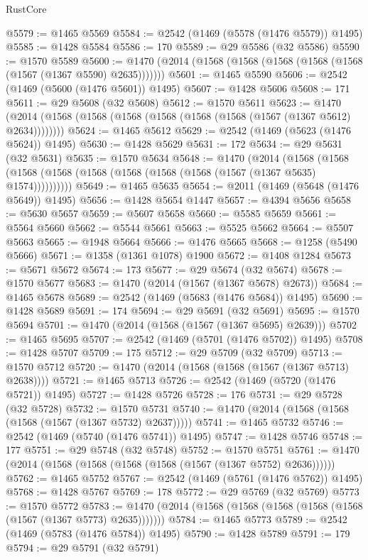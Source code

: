 \begin{lexlean}{RustCore}
\begin{coremodule}
@5579 := @1465 @5569
@5584 := @2542 (@1469 (@5578 (@1476 @5579)) @1495)
@5585 := @1428 @5584
@5586 := 170
@5589 := @29 @5586 (@32 @5586)
@5590 := @1570 @5589
@5600 := @1470 (@2014 (@1568 (@1568 (@1568 (@1568 (@1568 (@1567 (@1367 @5590) @2635)))))))
@5601 := @1465 @5590
@5606 := @2542 (@1469 (@5600 (@1476 @5601)) @1495)
@5607 := @1428 @5606
@5608 := 171
@5611 := @29 @5608 (@32 @5608)
@5612 := @1570 @5611
@5623 := @1470 (@2014 (@1568 (@1568 (@1568 (@1568 (@1568 (@1568 (@1567 (@1367 @5612) @2634))))))))
@5624 := @1465 @5612
@5629 := @2542 (@1469 (@5623 (@1476 @5624)) @1495)
@5630 := @1428 @5629
@5631 := 172
@5634 := @29 @5631 (@32 @5631)
@5635 := @1570 @5634
@5648 := @1470
    (@2014
      (@1568 (@1568 (@1568 (@1568 (@1568 (@1568 (@1568 (@1568 (@1567 (@1367 @5635) @1574))))))))))
@5649 := @1465 @5635
@5654 := @2011 (@1469 (@5648 (@1476 @5649)) @1495)
@5656 := @1428 @5654 @1447
@5657 := @4394 @5656
@5658 := @5630 @5657
@5659 := @5607 @5658
@5660 := @5585 @5659
@5661 := @5564 @5660
@5662 := @5544 @5661
@5663 := @5525 @5662
@5664 := @5507 @5663
@5665 := @1948 @5664
@5666 := @1476 @5665
@5668 := @1258 (@5490 @5666)
@5671 := @1358 (@1361 @1078) @1900
@5672 := @1408 @1284
@5673 := @5671 @5672
@5674 := 173
@5677 := @29 @5674 (@32 @5674)
@5678 := @1570 @5677
@5683 := @1470 (@2014 (@1567 (@1367 @5678) @2673))
@5684 := @1465 @5678
@5689 := @2542 (@1469 (@5683 (@1476 @5684)) @1495)
@5690 := @1428 @5689
@5691 := 174
@5694 := @29 @5691 (@32 @5691)
@5695 := @1570 @5694
@5701 := @1470 (@2014 (@1568 (@1567 (@1367 @5695) @2639)))
@5702 := @1465 @5695
@5707 := @2542 (@1469 (@5701 (@1476 @5702)) @1495)
@5708 := @1428 @5707
@5709 := 175
@5712 := @29 @5709 (@32 @5709)
@5713 := @1570 @5712
@5720 := @1470 (@2014 (@1568 (@1568 (@1567 (@1367 @5713) @2638))))
@5721 := @1465 @5713
@5726 := @2542 (@1469 (@5720 (@1476 @5721)) @1495)
@5727 := @1428 @5726
@5728 := 176
@5731 := @29 @5728 (@32 @5728)
@5732 := @1570 @5731
@5740 := @1470 (@2014 (@1568 (@1568 (@1568 (@1567 (@1367 @5732) @2637)))))
@5741 := @1465 @5732
@5746 := @2542 (@1469 (@5740 (@1476 @5741)) @1495)
@5747 := @1428 @5746
@5748 := 177
@5751 := @29 @5748 (@32 @5748)
@5752 := @1570 @5751
@5761 := @1470 (@2014 (@1568 (@1568 (@1568 (@1568 (@1567 (@1367 @5752) @2636))))))
@5762 := @1465 @5752
@5767 := @2542 (@1469 (@5761 (@1476 @5762)) @1495)
@5768 := @1428 @5767
@5769 := 178
@5772 := @29 @5769 (@32 @5769)
@5773 := @1570 @5772
@5783 := @1470 (@2014 (@1568 (@1568 (@1568 (@1568 (@1568 (@1567 (@1367 @5773) @2635)))))))
@5784 := @1465 @5773
@5789 := @2542 (@1469 (@5783 (@1476 @5784)) @1495)
@5790 := @1428 @5789
@5791 := 179
@5794 := @29 @5791 (@32 @5791)

\end{coremodule}
\end{lexlean}
